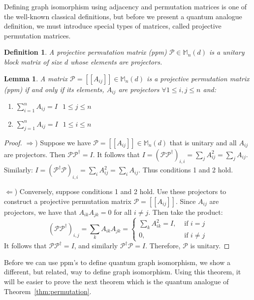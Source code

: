 \documentclass[12pt]{article}
\newtheorem{lem}[thm]{Lemma}
\newtheorem{defn}[thm]{Definition}
\begin{document}
Defining graph isomorphism using adjacency and permutation matrices is
one of the well-known classical definitions, but before we present a
quantum analogue definition, we must introduce special types of
matrices, called projective permutation matrices.

\begin{defn}
  A projective permutation matrix (ppm) $\mathcal{P} \in
  \mathbb{M}_n(d)$ is a unitary block matrix of size $d$ whose
  elements are projectors.
\end{defn}

\begin{lem}
  \label{ppm}
  A matrix $\mathcal{P} = [[A_{ij}]] \in \mathbb{M}_n(d)$ is a
  projective permutation matrix (ppm) if and only if its elements,
  $A_{ij}$ are projectors $\forall 1 \leq i, j \leq n$ and:
  \begin{enumerate}
  \item $\sum_{i=1}^n A_{ij} = I$ $ $ $1 \leq j \leq n$
  \item $\sum_{j=1}^n A_{ij} = I$ $ $ $1 \leq i \leq n$
  \end{enumerate}
\end{lem}

\begin{proof}
$\Rightarrow$) Suppose we have $\mathcal{P} = [[A_{ij}]] \in
  \mathbb{M}_n(d)$ that is unitary and all $A_{ij}$ are
  projectors. Then $\mathcal{P} \mathcal{P}^{\dag} = I$. It follows
  that $I = (\mathcal{P} \mathcal{P}^{\dag})_{i, i} = \sum_j A_{ij}^2
  = \sum_j A_{ij}$. Similarly: $I = (\mathcal{P}^{\dag}
  \mathcal{P})_{i, i} = \sum_i A_{ij}^2 = \sum_i A_{ij}$. Thus
  conditions 1 and 2 hold.

$\Leftarrow$) Conversely, suppose conditions 1 and 2 hold. Use these
  projectors to construct a projective permutation matrix $\mathcal{P}
  = [[A_{ij}]]$. Since $A_{ij}$ are projectors, we have that
  $A_{ik}A_{jk} = 0$ for all $i \neq j$. Then take the product:
\[ (\mathcal{P}\mathcal{P}^{\dag})_{i,j} = \sum_k A_{ik}A_{jk} = \begin{cases} 
\sum_k A_{ik}^2 = I, & \text{ if } i = j \\ 0, & \text{ if } i \neq
j \end{cases}
\]
It follows that $\mathcal{P}\mathcal{P}^{\dag} = I$, and similarly
$\mathcal{P}^{\dag} \mathcal{P} = I$. Therefore, $\mathcal{P}$ is
unitary.
\end{proof}

Before we can use ppm's to define quantum graph isomorphism, we show a
different, but related, way to define graph isomorphism. Using this
theorem, it will be easier to prove the next theorem which is the
quantum analogue of Theorem~\ref{thm:permutation}.
\end{document}
